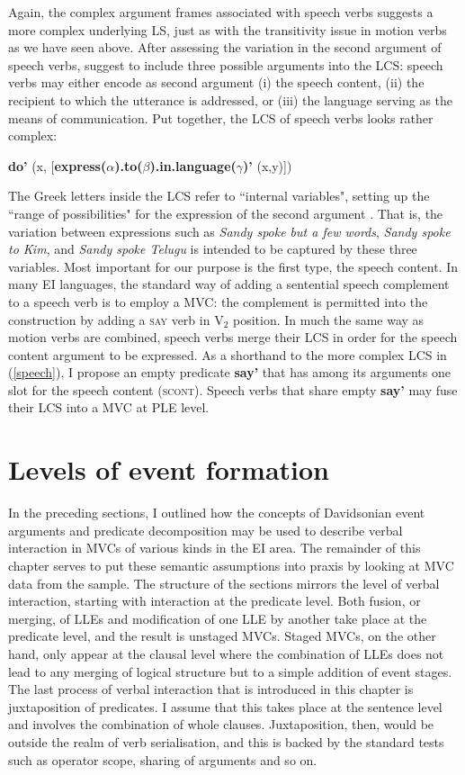 Again, the complex argument frames associated with speech verbs suggests a more complex underlying LS, just as with the transitivity issue in motion verbs as we have seen above. After assessing the variation in the second argument of speech verbs, \citet{van1997syntax} suggest to include three possible arguments into the LCS: speech verbs may either encode as second argument (i) the speech content, (ii) the recipient to which the utterance is addressed, or (iii) the language serving as the means of communication. Put together, the LCS of speech verbs looks rather complex: 

\ea \label{speech}
\textbf{do'} (x, [\textbf{express($\alpha$).to($\beta$).in.language($\gamma$)'} (x,y)])
\z

The Greek letters inside the LCS refer to ``internal variables", setting up the ``range of possibilities" for the expression of the second argument \citep[117]{van1997syntax}. That is, the variation between expressions such as \textit{Sandy spoke but a few words}, \textit{Sandy spoke to Kim}, and \textit{Sandy spoke Telugu} is intended to be captured by these three variables. Most important for our purpose is the first type, the speech content. In many EI languages, the standard way of adding a sentential speech complement to a speech verb is to employ a MVC: the complement is permitted into the construction by adding a \textsc{say} verb in V$_2$ position. In much the same way as motion verbs are combined, speech verbs merge their LCS in order for the speech content argument to be expressed. As a shorthand to the more complex LCS in (\ref{speech}), I propose an empty predicate \textbf{say'} that has among its arguments one slot for the speech content (\textsc{scont}). Speech verbs that share empty \textbf{say'} may fuse their LCS into a MVC at PLE level.

\section{Levels of event formation}\label{sec:levels-event}

In the preceding sections, I outlined how the concepts of Davidsonian event arguments and predicate decomposition may be used to describe verbal interaction in MVCs of various kinds in the EI area. The remainder of this chapter serves to put these semantic assumptions into praxis by looking at MVC data from the sample. The structure of the sections mirrors the level of verbal interaction, starting with interaction at the predicate level. Both fusion, or merging, of LLEs and modification of one LLE by another take place at the predicate level, and the result is unstaged MVCs. Staged MVCs, on the other hand, only appear at the clausal level where the combination of LLEs does not lead to any merging of logical structure but to a simple addition of event stages. The last process of verbal interaction that is introduced in this chapter is juxtaposition of predicates. I assume that this takes place at the sentence level and involves the combination of whole clauses. Juxtaposition, then, would be outside the realm of verb serialisation, and this is backed by the standard tests such as operator scope, sharing of arguments and so on.

